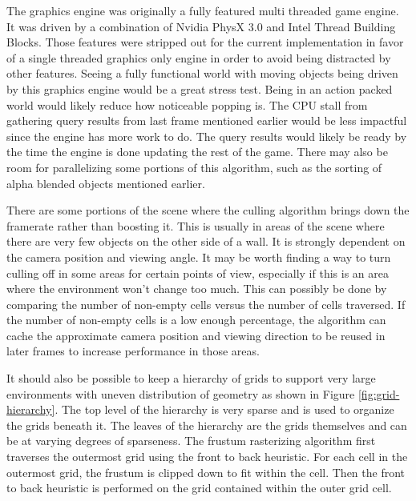 \documentclass[12pt]{ucthesis}
\begin{document}
The graphics engine was originally a fully featured multi threaded game engine.
It was driven by a combination of Nvidia PhysX 3.0 and Intel Thread Building Blocks.
Those features were stripped out for the current implementation in favor of a single threaded graphics only engine in order to avoid being distracted by other features.
Seeing a fully functional world with moving objects being driven by this graphics engine would be a great stress test.
Being in an action packed world would likely reduce how noticeable popping is.
The CPU stall from gathering query results from last frame mentioned earlier would be less impactful since the engine has more work to do.
The query results would likely be ready by the time the engine is done updating the rest of the game.
There may also be room for parallelizing some portions of this algorithm, such as the sorting of alpha blended objects mentioned earlier.

There are some portions of the scene where the culling algorithm brings down the framerate rather than boosting it.
This is usually in areas of the scene where there are very few objects on the other side of a wall.
It is strongly dependent on the camera position and viewing angle.
It may be worth finding a way to turn culling off in some areas for certain points of view, especially if this is an area where the environment won't change too much.
This can possibly be done by comparing the number of non-empty cells versus the number of cells traversed.
If the number of non-empty cells is a low enough percentage, the algorithm can cache the approximate camera position and viewing direction to be reused in later frames to increase performance in those areas.

It should also be possible to keep a hierarchy of grids to support very large environments with uneven distribution of geometry as shown in Figure \ref{fig:grid-hierarchy}.
The top level of the hierarchy is very sparse and is used to organize the grids beneath it.
The leaves of the hierarchy are the grids themselves and can be at varying degrees of sparseness.
The frustum rasterizing algorithm first traverses the outermost grid using the front to back heuristic.
For each cell in the outermost grid, the frustum is clipped down to fit within the cell.
Then the front to back heuristic is performed on the grid contained within the outer grid cell.
\end{document}
